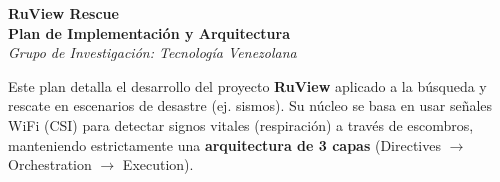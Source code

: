 \documentclass[a4paper,10pt]{article}
\begin{document}
\begin{center}
    \vspace*{0.5cm}
    {\Huge \textbf{\textcolor{primary}{RuView Rescue}}}\\[0.5cm]
    {\LARGE \textbf{Plan de Implementación y Arquitectura}}\\[0.2cm]
    {\large \textit{Grupo de Investigación: Tecnología Venezolana}}\\[1cm]
\end{center}

\begin{tcolorbox}[infobox, title=Descripción del Proyecto, colframe=secondary, boxed title style={colback=secondary}]
Este plan detalla el desarrollo del proyecto \textbf{RuView} aplicado a la búsqueda y rescate en escenarios de desastre (ej. sismos). Su núcleo se basa en usar señales WiFi (CSI) para detectar signos vitales (respiración) a través de escombros, manteniendo estrictamente una \textbf{arquitectura de 3 capas} (Directives $\rightarrow$ Orchestration $\rightarrow$ Execution).
\end{tcolorbox}
\end{document}
